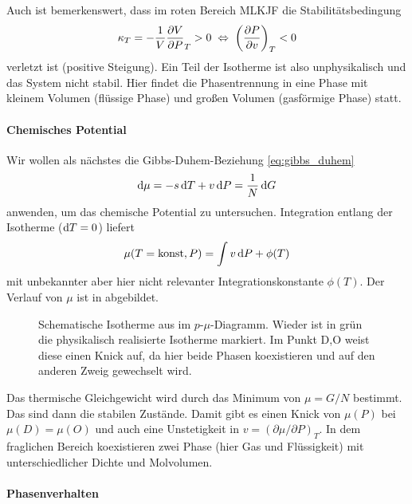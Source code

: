 Auch ist bemerkenswert, dass im roten Bereich MLKJF die Stabilitätsbedingung
\begin{align*}
    \kappa_T=-\frac{1}{V}\frac{\partial V}{\partial P}_T>0 \;\Leftrightarrow\; \left( \frac{\partial P}{\partial v} \right)_T<0
\end{align*}
verletzt ist (positive Steigung). Ein Teil der Isotherme ist also unphysikalisch und das System nicht stabil. Hier findet die Phasentrennung in eine Phase mit kleinem Volumen (flüssige Phase) und großen Volumen (gasförmige Phase) statt.

\paragraph*{Chemisches Potential}

Wir wollen als nächstes die Gibbs-Duhem-Beziehung \eqref{eq:gibbs_duhem}
\begin{align*}
    \mathop{}\!\mathrm{d}\mu=-s\mathop{}\!\mathrm{d} T+v\mathop{}\!\mathrm{d} P=\frac{1}{N}\mathop{}\!\mathrm{d} G
\end{align*}
anwenden, um das chemische Potential zu untersuchen. Integration entlang der Isotherme ($\mathop{}\!\mathrm{d} T=0$) liefert
\begin{align*}
    \mu(T=\mathrm{konst},P) = \int v\mathop{}\!\mathrm{d} P +\phi(T)
\end{align*}
mit unbekannter aber hier nicht relevanter Integrationskonstante $\phi(T)$. Der Verlauf von $\mu$ ist in  abgebildet.

\begin{figure}[htbp]
    \centering
    \tfigPhaseSeparationChemPotential
    \caption{Schematische Isotherme aus  im $p$-$\mu$-Diagramm. Wieder ist in grün die physikalisch realisierte Isotherme markiert. Im Punkt D,O weist diese einen Knick auf, da hier beide Phasen koexistieren und auf den anderen Zweig gewechselt wird. }
    \label{fig:PhaseSeparationChemPotential}
\end{figure}

Das thermische Gleichgewicht wird durch das Minimum von $\mu=G/N$ bestimmt. Das sind dann die stabilen Zustände.  Damit gibt es einen Knick von $\mu(P)$ bei $\mu(D)=\mu(O)$ und auch eine Unstetigkeit in $v=(\partial\mu/\partial P)_T$. In dem fraglichen Bereich koexistieren zwei Phase (hier Gas und Flüssigkeit) mit unterschiedlicher Dichte und Molvolumen.


\paragraph*{Phasenverhalten}

